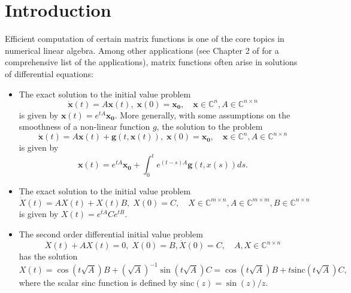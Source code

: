 \section{Introduction}

Efficient computation of certain matrix functions is one of the core topics in numerical linear
algebra. Among other applications (see Chapter 2 of \cite{higham2008functions} for a
comprehensive list of the applications), matrix functions often arise in solutions of
differential equations:
\begin{itemize}
    \item The exact solution to the initial value problem
        \begin{equation*}
            \dot{\mathbf{x}}(t) = A \mathbf{x}(t),\;
            \mathbf{x}(0) = \mathbf{x_0}, \quad
            \mathbf{x} \in \mathbb{C}^{n},
            A \in \mathbb{C}^{n \times n}
        \end{equation*}
        is given by $\mathbf{x}(t) = e^{tA} \mathbf{x_0}$.
        More generally, with some assumptions on the smoothness
        of a non-linear function $g$, the solution to the problem
        \begin{equation}
            \label{eq:exponentialintegratorproblem}
            \dot{\mathbf{x}}(t) = A \mathbf{x}(t) + \mathbf{g}(t, \mathbf{x}(t)), \; \mathbf{x}(0) = \mathbf{x_0},
            \quad \mathbf{x} \in \mathbb{C}^{n}, A \in \mathbb{C}^{n \times n}
        \end{equation}
        is given by
        \begin{equation}
            \label{eq:exponentialintegratorsolution}
            \mathbf{x}(t) = e^{tA} \mathbf{x_0} + \int_{0}^{t}{e^{(t-s)A} \mathbf{g}(t, x(s)) ds}.
        \end{equation}

    \item The exact solution to the initial value problem
    \begin{equation*}
        \dot{X}(t) = A X(t) + X(t) B, \; X(0) = C, \quad X \in \mathbb{C}^{m \times n}, A \in \mathbb{C}^{m \times m}, B \in \mathbb{C}^{n \times n}
    \end{equation*}
    is given by $X(t) = e^{tA} C e^{tB}$.

    \item The second order differential initial value problem
    \begin{equation*}
        \ddot{X}(t) + A X(t) = 0, \; X(0) = B, \dot{X}(0) = C, \quad A, X \in \mathbb{C}^{n \times n}
    \end{equation*}
    has the solution
    \begin{equation*}
        X(t) = \cos(t \sqrt{A}) B + (\sqrt{A})^{-1} \sin(t \sqrt{A}) C
        = \cos(t \sqrt{A}) B + t \mathrm{sinc}(t \sqrt{A}) C,
    \end{equation*}
    where the scalar sinc function is defined by $\mathrm{sinc}(z) = \sin(z) / z$.
\end{itemize}

